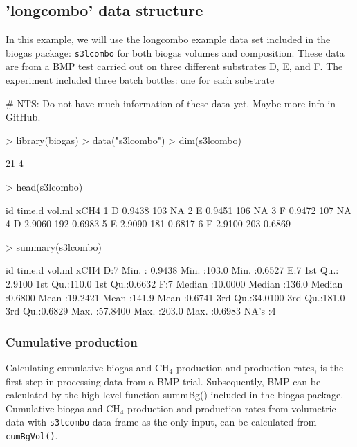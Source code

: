 \documentclass{article}
\begin{document}
\subsection{'longcombo' data structure}
In this example, we will use the longcombo example data set included in the biogas package: \texttt{s3lcombo} for both biogas volumes and composition.
These data are from a BMP test carried out on three different substrates D, E, and F.
The experiment included three batch bottles: one for each substrate

# NTS: Do not have much information of these data yet. Maybe more info in GitHub.

\begin{Schunk}
\begin{Sinput}
> library(biogas)
> data("s3lcombo")
> dim(s3lcombo)
\end{Sinput}
\begin{Soutput}
[1] 21  4
\end{Soutput}
\begin{Sinput}
> head(s3lcombo)
\end{Sinput}
\begin{Soutput}
  id time.d vol.ml   xCH4
1  D 0.9438    103     NA
2  E 0.9451    106     NA
3  F 0.9472    107     NA
4  D 2.9060    192 0.6983
5  E 2.9090    181 0.6817
6  F 2.9100    203 0.6869
\end{Soutput}
\begin{Sinput}
> summary(s3lcombo)
\end{Sinput}
\begin{Soutput}
 id        time.d            vol.ml           xCH4       
 D:7   Min.   : 0.9438   Min.   :103.0   Min.   :0.6527  
 E:7   1st Qu.: 2.9100   1st Qu.:110.0   1st Qu.:0.6632  
 F:7   Median :10.0000   Median :136.0   Median :0.6800  
       Mean   :19.2421   Mean   :141.9   Mean   :0.6741  
       3rd Qu.:34.0100   3rd Qu.:181.0   3rd Qu.:0.6829  
       Max.   :57.8400   Max.   :203.0   Max.   :0.6983  
                                         NA's   :4       
\end{Soutput}
\end{Schunk}

\subsubsection*{Cumulative production}
Calculating cumulative biogas and CH$_4$ production and production rates, is the first step in processing data from a BMP trial. Subsequently, BMP can be calculated by the high-level function summBg() included in the biogas package.
Cumulative biogas and CH$_4$ production and production rates from volumetric data with \texttt{s3lcombo} data frame as the only input, can be calculated from \texttt{cumBgVol()}.
\end{document}
